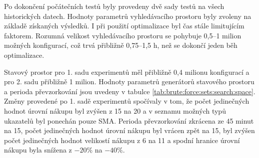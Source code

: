 Po dokončení počátečních testů byly provedeny dvě sady testů na všech historických datech.
Hodnoty parametrů vyhledávacího prostoru byly zvoleny na základě získaných výsledků.
I při použití optimalizace byl čas stále limitujícím faktorem.
Rozumná velikost vyhledávacího prostoru se pohybuje 0,5--1 milion možných konfigurací, což trvá přibližně 0,75--1,5 h, než se dokončí jeden běh optimalizace.

Stavový prostor pro 1. sadu experimentů měl přibližně 0,4 milionu konfigurací a pro 2. sadu přibližně 1 milion.
Hodnoty parametrů generátorů stavového prostoru a perioda převzorkování jsou uvedeny v tabulce \ref{tab:brute:force:sets:search:space}.
Změny provedené po 1. sadě experimentů spočívaly v tom, že počet jedinečných hodnot úrovní nákupu byl zvýšen z 15 na 20 a v seznamu možných typů ukazatelů byl ponechán pouze SMA.
Perioda převzorkování zkrácena ze 45 minut na 15, počet jedinečných hodnot úrovní nákupu byl vrácen zpět na 15, byl zvýšen počet jedinečných hodnot velikostí nákupu z 6 na 11 a spodní hranice úrovní nákupu byla snížena z \(-20 \%\) na \(-40 \%\).

